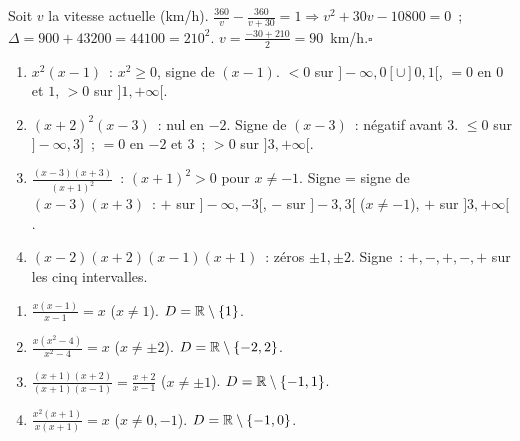 Soit $v$ la vitesse actuelle (km/h).
$\frac{360}{v}-\frac{360}{v+30}=1\Rightarrow v^2+30v-10800=0$~; $\Delta=900+43200=44100=210^2$.
$v=\frac{-30+210}{2}=90$~km/h.\hfill$\square$


\begin{enumerate}
  \item $x^2(x-1)$~: $x^2\geq0$, signe de $(x-1)$.
        $<0$ sur $]-\infty,0[\cup]0,1[$, $=0$ en $0$ et $1$, $>0$ sur $]1,+\infty[$.
  \item $(x+2)^2(x-3)$~: nul en $-2$. Signe de $(x-3)$~: n\'egatif avant $3$.
        $\leq0$ sur $]-\infty,3]$~; $=0$ en $-2$ et $3$~; $>0$ sur $]3,+\infty[$.
  \item $\frac{(x-3)(x+3)}{(x+1)^2}$~: $(x+1)^2>0$ pour $x\ne-1$.
        Signe = signe de $(x-3)(x+3)$~: $+$ sur $]-\infty,-3[$, $-$ sur $]-3,3[$ ($x\ne-1$),
        $+$ sur $]3,+\infty[$.
  \item $(x-2)(x+2)(x-1)(x+1)$~: z\'eros $\pm1,\pm2$.
        Signe~: $+,-,+,-,+$ sur les cinq intervalles.
\end{enumerate}


\begin{enumerate}
  \item $\frac{x(x-1)}{x-1}=x$ ($x\ne1$). $D=\mathbb{R}\setminus\{1\}$.
  \item $\frac{x(x^2-4)}{x^2-4}=x$ ($x\ne\pm2$). $D=\mathbb{R}\setminus\{-2,2\}$.
  \item $\frac{(x+1)(x+2)}{(x+1)(x-1)}=\frac{x+2}{x-1}$ ($x\ne\pm1$). $D=\mathbb{R}\setminus\{-1,1\}$.
  \item $\frac{x^2(x+1)}{x(x+1)}=x$ ($x\ne0,-1$). $D=\mathbb{R}\setminus\{-1,0\}$.
\end{enumerate}


